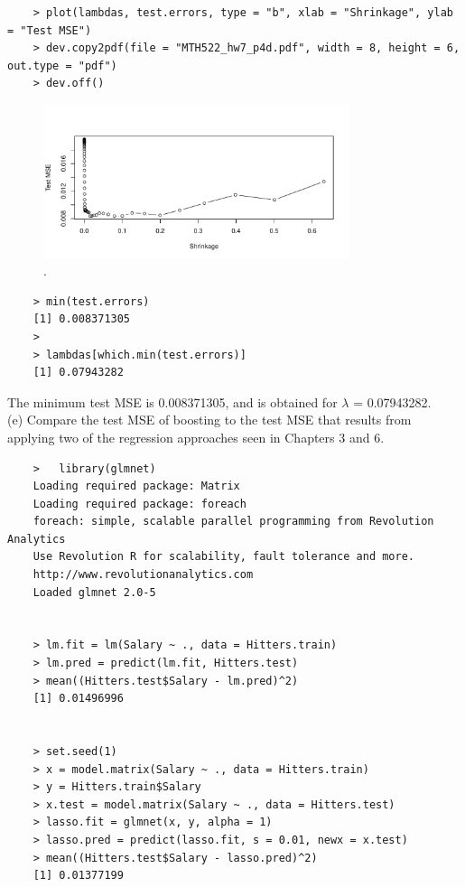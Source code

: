 \documentclass{article}
\begin{document}
\begin{program}
	\begin{verbatim}
	> plot(lambdas, test.errors, type = "b", xlab = "Shrinkage", ylab = "Test MSE")
	> dev.copy2pdf(file = "MTH522_hw7_p4d.pdf", width = 8, height = 6, out.type = "pdf")
	> dev.off()
	\end{verbatim}
\end{program}

\begin{figure}[htb]
	\begin{center}
		\includegraphics[width=0.8\textwidth]{MTH522_hw7_p4d.pdf}
	\end{center}
	\caption{.}
	\label{fig:MTH522_hw7_p4d}
\end{figure}

\newpage

\begin{program}
	\begin{verbatim}
	> min(test.errors)
	[1] 0.008371305
	> 
	> lambdas[which.min(test.errors)]
	[1] 0.07943282
	\end{verbatim}
\end{program}
The minimum test MSE is 0.008371305, and is obtained for $\lambda$ = 0.07943282.\\


(e) Compare the test MSE of boosting to the test MSE that results from applying two of the regression approaches seen in Chapters 3 and 6. \\

\begin{program}
	\begin{verbatim}
	>   library(glmnet)
	Loading required package: Matrix
	Loading required package: foreach
	foreach: simple, scalable parallel programming from Revolution Analytics
	Use Revolution R for scalability, fault tolerance and more.
	http://www.revolutionanalytics.com
	Loaded glmnet 2.0-5
	
	
	> lm.fit = lm(Salary ~ ., data = Hitters.train)
	> lm.pred = predict(lm.fit, Hitters.test)
	> mean((Hitters.test$Salary - lm.pred)^2)
	[1] 0.01496996
	
	
	> set.seed(1)
	> x = model.matrix(Salary ~ ., data = Hitters.train)
	> y = Hitters.train$Salary
	> x.test = model.matrix(Salary ~ ., data = Hitters.test)
	> lasso.fit = glmnet(x, y, alpha = 1)
	> lasso.pred = predict(lasso.fit, s = 0.01, newx = x.test)
	> mean((Hitters.test$Salary - lasso.pred)^2)
	[1] 0.01377199
	\end{verbatim}
\end{program}
\end{document}
